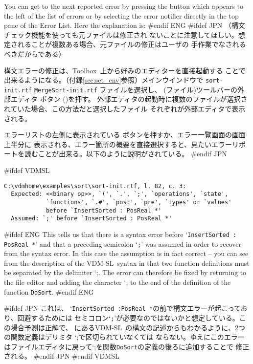 \documentclass[\pformat,12pt]{article}
\newcommand{\vdmslpp}{VDM-SL}
\newcommand{\Toolbox}{Toolbox}
\newcommand{\vdmhome}{vdmhome}
\newcommand{\vdmslpp}{VDM++}
\newcommand{\Toolbox}{Toolbox}
\newcommand{\vdmhome}{vpphome}
\newcommand{\Lit}[1]{`#1\Quote}
\newcommand{\aaa}{\tt }
\newcommand{\guicmd}[1]{{\sf #1}}
\newcommand{\guicmd}[1]{{\gt #1}}
\begin{document}
You can get to the next reported error by pressing the {\fbox{\tt >}}
button which appears to the left of the list of errors or by selecting the
error notifier directly in the top pane of the \guicmd{Error
  List}. Here the explanation is: 
#endif ENG
#ifdef JPN
（構文チェック機能を使っても元ファイルは修正され
ないことに注意してほしい。想定されることが複数ある場合、元ファイルの修正はユーザの
手作業でなされるべきだからである）

構文エラーの修正は、\Toolbox\ 上から好みのエディターを直接起動する
ことで出来るようになる。（付録\ref{sec:set_env}参照）メインウインドウで
{
{\tt sort-init.rtf}
}
{
{\tt MergeSort-init.rtf}
}
ファイルを選択し、
(\guicmd{ファイル})ツールバーの\guicmd{外部エディタ} ボタン
()を押す。
外部エディタの起動時に複数のファイルが選択されていた場合、この方法だと選択したファイル
それぞれが\guicmd{外部エディタ}で表示される。

エラーリストの左側に表示されている {\fbox{\tt >}}ボタンを押すか、\guicmd{エラー一覧}画面の画面上半分に
表示される、エラー箇所の概要を直接選択すると、見たいエラーリポートを読むことが出来る。以下のように説明がされている。
#endif JPN

#ifdef VDMSL
\begin{verbatim}
C:\vdmhome\examples\sort\sort-init.rtf, l. 82, c. 3:
  Expected: <<binary op>>, `(', `.', `;', `operations', `state',
            `functions', `.#', `post', `pre', `types' or `values' 
            before `InsertSorted : PosReal *'
  Assumed: `;' before `InsertSorted : PosReal *'
\end{verbatim}

#ifdef ENG
This tells us that there is a syntax error before `{\tt InsertSorted :
  PosReal *}' and that a preceding semicolon `{\tt ;}' was assumed in
  order to recover from the syntax error. In this case the assumption
  is in fact correct -- you can see from the  description of the
\vdmslpp\ syntax in \cite{UMLMan-CSK} that two function definitions must
  be separated by the delimiter \Lit{;}. The error can therefore be
  fixed by returning to the file editor and adding the character
  \Lit{;} to the end of the definition of the function {\aaa DoSort}.
#endif ENG

#ifdef JPN
これは、 `{\tt InsertSorted :PosReal *}の前で構文エラーが起こっており、回避するためには
セミコロン`{\tt ;}'が必要なのではないかと想定している。この場合予測は正解で、 \cite{UMLMan-CSK}
にある\vdmslpp\ の構文の記述からもわかるように、2つの関数定義はデリミタ \Lit{;}で区切られていなくては
ならない。ゆえにこのエラーはファイルエディタに戻って\Lit{;}を関数{\aaa DoSort}の定義の後ろに追加することで
修正される。
#endif JPN
#endif VDMSL
\end{document}
